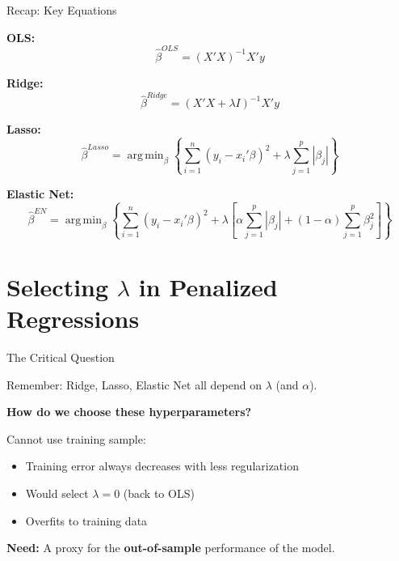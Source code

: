\documentclass[10pt]{beamer}
\newcommand{\highlight}[1]{\textcolor{AccentOrange}{\textbf{#1}}}
\DeclareMathOperator*{\argmin}{arg\,min}
\begin{document}

\begin{frame}{Recap: Key Equations}

\textbf{OLS:}
\[
\widehat{\beta}^{OLS} = (X'X)^{-1}X'y
\]

\vspace{0.5em}
\textbf{Ridge:}
\[
\widehat{\beta}^{Ridge} = (X'X + \lambda I)^{-1}X'y
\]

\vspace{0.5em}
\textbf{Lasso:}
\[
\widehat{\beta}^{Lasso} = \argmin_\beta \left\{ \sum_{i=1}^n (y_i - x_i'\beta)^2 + \lambda \sum_{j=1}^p |\beta_j| \right\}
\]

\vspace{0.5em}
\textbf{Elastic Net:}
\[
\widehat{\beta}^{EN} = \argmin_\beta \left\{ \sum_{i=1}^n (y_i - x_i'\beta)^2 + \lambda \left[ \alpha \sum_{j=1}^p |\beta_j| + (1-\alpha) \sum_{j=1}^p \beta_j^2 \right] \right\}
\]

\end{frame}



\section{Selecting $\lambda$ in Penalized Regressions}

\begin{frame}{The Critical Question}

Remember: Ridge, Lasso, Elastic Net all depend on $\lambda$ (and $\alpha$).

\vspace{1em}
\textbf{How do we choose these hyperparameters?}

\vspace{0.5em}
Cannot use training sample:
\begin{itemize}
  \item Training error always decreases with less regularization
  \item Would select $\lambda = 0$ (back to OLS)
  \item Overfits to training data
\end{itemize}

\vspace{1em}
\textbf{Need:} A proxy for the  \highlight{out-of-sample} performance of the model. 

\end{frame}
\end{document}
